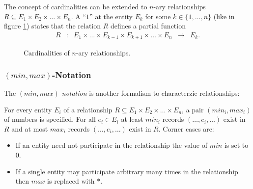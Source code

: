 The concept of cardinalities can be extended to $n$-ary relationships $R \subseteq E_1 \times E_2 \times \ldots \times E_n$. A ``$1$'' at the entity $E_k$ for some $k \in \{1,\ldots,n\}$ (like in figure \ref{fig_nary_cardinalities}) states that the relation $R$ defines a partial function
\[ \begin{array}{rclcl}
R & : & E_1 \times \ldots \times E_{k-1} \times E_{k+1} \times \ldots \times E_n & \rightarrow & E_k.
\end{array} \]

\begin{figure}[htbp]
\begin{center}
\end{center}
\caption[Cardinalities of n-ary Relationships]{Cardinalities of $n$-ary relationships.}
\label{fig_nary_cardinalities}
\end{figure}




\subsubsection[(min,max)-Notation]{$(min,max)$-Notation}

The \emph{$(min,max)$-notation} is another formalism to characterzie relationships:

For every entity $E_i$ of a relationship $R \subseteq E_1 \times E_2 \times \ldots \times E_n$, a pair $(min_i,max_i)$ of numbers is specified. For all $e_i  \in E_i$ at least $min_i$ records $(\ldots,e_i,\ldots)$ exist in $R$ and at most $max_i$ records $(\ldots,e_i,\ldots)$ exist in $R$. Corner cases are:
\begin{itemize}
\item If an entity need not participate in the relationship the value of $min$ is set to $0$.
\item If a single entity may participate arbitrary many times in the relationship then $max$ is replaced with $\ast$.
\end{itemize}


